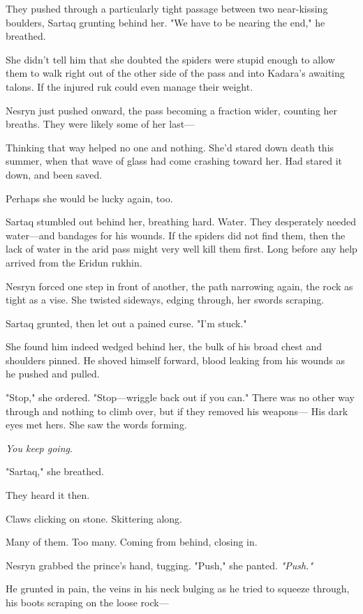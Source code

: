 They pushed through a particularly tight passage between two near-kissing boulders, Sartaq grunting behind her. "We have to be nearing the end," he breathed.

She didn't tell him that she doubted the spiders were stupid enough to allow them to walk right out of the other side of the pass and into Kadara's awaiting talons. If the injured ruk could even manage their weight.

Nesryn just pushed onward, the pass becoming a fraction wider, counting her breaths. They were likely some of her last---

Thinking that way helped no one and nothing. She'd stared down death this summer, when that wave of glass had come crashing toward her. Had stared it down, and been saved.

Perhaps she would be lucky again, too.

Sartaq stumbled out behind her, breathing hard. Water. They desperately needed water---and bandages for his wounds. If the spiders did not find them, then the lack of water in the arid pass might very well kill them first. Long before any help arrived from the Eridun rukhin.

Nesryn forced one step in front of another, the path narrowing again, the rock as tight as a vise. She twisted sideways, edging through, her swords scraping.

Sartaq grunted, then let out a pained curse. "I'm stuck."

She found him indeed wedged behind her, the bulk of his broad chest and shoulders pinned. He shoved himself forward, blood leaking from his wounds as he pushed and pulled.

"Stop," she ordered. "Stop---wriggle back out if you can." There was no other way through and nothing to climb over, but if they removed his weapons--- His dark eyes met hers. She saw the words forming.

\emph{You keep going}.

"Sartaq," she breathed.

They heard it then.

Claws clicking on stone. Skittering along.

Many of them. Too many. Coming from behind, closing in.

Nesryn grabbed the prince's hand, tugging. "Push," she panted.
\emph{"Push."}

He grunted in pain, the veins in his neck bulging as he tried to squeeze through, his boots scraping on the loose rock---

